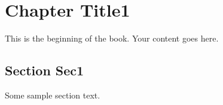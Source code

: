\chapter{Chapter Title1}
This is the beginning of the book. Your content goes here.

\section{Section Sec1}
Some sample section text.